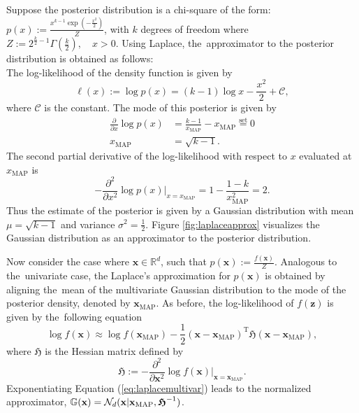 \vspace{-1cm}
\begin{exmp}
Suppose the posterior distribution is a chi-square of the form: $p(x):=\frac{x^{k-1}\exp\left(-\frac{x^2}{2}\right)}{Z}$, with $k$ degrees of freedom where $Z:=2^{\frac{k}{2}-1}\Gamma\left(\frac{k}{2}\right),\quad x>0$. Using Laplace, \mbox{the approximator} to the posterior distribution is obtained as follows:\\[.3cm]
The log-likelihood of the density function is given by
\begin{equation}
\ell(x):=\log p(x)=(k-1)\log x-\frac{x^2}{2}+\mathcal{C},
\end{equation}
where $\mathcal{C}$ is the constant. The mode of this posterior is given by
\begin{align}
\frac{\partial}{\partial x}\log  p(x)&=\frac{k-1}{x_{\text{MAP}}}-x_{\text{MAP}}\overset{\text{set}}{=}0\\
x_{\text{MAP}}&=\sqrt{k-1}.
\end{align}
The second partial derivative of the log-likelihood with respect to $x$ evaluated at $x_{\text{MAP}}$ is
\begin{equation}\label{eq:laplaceexapprox}
-\frac{\partial^2}{\partial x^2}\log  p(x)\bigg|_{x=x_{\text{MAP}}}=1-\frac{1-k}{x_{\text{MAP}}^2}=2.
\end{equation}
Thus the estimate of the posterior is given by a Gaussian distribution with mean $\mu=\sqrt{k-1}$ and variance $\sigma^2 = \frac{1}{2}$. Figure \ref{fig:laplaceapprox} visualizes the Gaussian distribution as an approximator to the posterior distribution.
\end{exmp}
Now consider the case where $\mathbf{x}\in\mathbb{R}^{d}$, such that $ p(\mathbf{x}):=\frac{f(\mathbf{x})}{Z}$. Analogous to \mbox{the univariate} case, the Laplace's approximation for $ p(\mathbf{x})$ is obtained by aligning \mbox{the mean} of the multivariate Gaussian distribution to the mode of the posterior density, denoted by $\mathbf{x}_{\text{MAP}}$. As before, the log-likelihood of $f(\mathbf{z})$ is given by \mbox{the following} equation
\begin{equation}\label{eq:laplacemultivar}
\log f(\mathbf{x})\approx\log f(\mathbf{x}_{\text{MAP}})-\frac{1}{2}(\mathbf{x}-\mathbf{x}_{\text{MAP}})^{\text{T}}\boldsymbol{\mathfrak{H}}(\mathbf{x}-\mathbf{x}_{\text{MAP}}),
\end{equation}
where $\boldsymbol{\mathfrak{H}}$ is the Hessian matrix defined by
\begin{equation}\label{eq:2ndderivlaplace}
\boldsymbol{\mathfrak{H}}:=-\frac{\partial^2}{\partial\mathbf{x}^2}\log f(\mathbf{x})\bigg|_{\mathbf{x}=\mathbf{x}_{\text{MAP}}}.
\end{equation}
Exponentiating Equation (\ref{eq:laplacemultivar}) leads to the normalized approximator, $\mathbb{G}(\mathbf{x})=\mathcal{N}_d(\mathbf{x}|\mathbf{x}_{\text{MAP}},\boldsymbol{\mathfrak{H}}^{-1})$.
